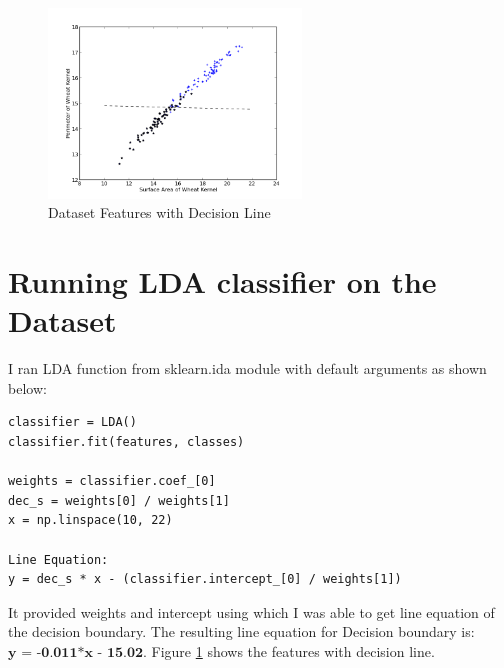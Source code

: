 \documentclass[11pt, pdftex]{article}
\begin{document}
\begin{figure}
    \centering
    \includegraphics[width=0.6\textwidth]{pics/decbou.png} 
    \caption{Dataset Features with Decision Line}
    \label{fig:decbou}
\end{figure}

\section{Running LDA classifier on the Dataset}
I ran LDA function from sklearn.ida module with default arguments as shown below:

\begin{lstlisting}
classifier = LDA()
classifier.fit(features, classes)

weights = classifier.coef_[0]
dec_s = weights[0] / weights[1]
x = np.linspace(10, 22)

Line Equation:
y = dec_s * x - (classifier.intercept_[0] / weights[1])
\end{lstlisting}

It provided weights and intercept using which I was able to get line equation of the decision boundary. The resulting line equation for Decision boundary is: $\textbf{y = -0.011*x - 15.02}$. Figure \ref{fig:decbou} shows the features with decision line.
\end{document}
